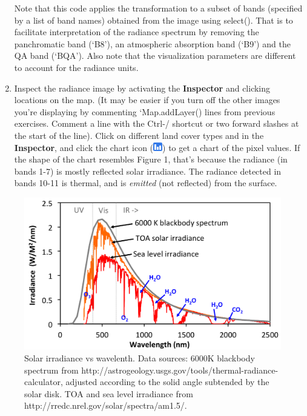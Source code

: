 \documentclass[
]{article}
\begin{document}
\begin{enumerate}
  Note that this code applies the transformation to a subset of bands (specified by a list of band names) obtained from the image using select(). That is to facilitate interpretation of the radiance spectrum by removing the panchromatic band (`B8'), an atmospheric absorption band (`B9') and the QA band (`BQA'). Also note that the visualization parameters are different to account for the radiance units.
\item
  Inspect the radiance image by activating the \textbf{Inspector} and clicking locations on the map. (It may be easier if you turn off the other images you're displaying by commenting `Map.addLayer() lines from previous exercises. Comment a line with the Ctrl-/ shortcut or two forward slashes at the start of the line). Click on different land cover types and in the \textbf{Inspector}, and click the chart icon (\includegraphics{./im/im_03_03.png}) to get a chart of the pixel values. If the shape of the chart resembles Figure 1, that's because the radiance (in bands 1-7) is mostly reflected solar irradiance. The radiance detected in bands 10-11 is thermal, and is \emph{emitted} (not reflected) from the surface.
\end{enumerate}

\begin{figure}

{\centering \includegraphics[width=0.95\linewidth]{./im/im_03_02} 

}

\caption{Solar irradiance vs wavelenth. Data sources: 6000K blackbody spectrum from http://astrogeology.usgs.gov/tools/thermal-radiance-calculator, adjusted according to the solid angle subtended by the solar disk. TOA and sea level irradiance from http://rredc.nrel.gov/solar/spectra/am1.5/.}\label{fig:irradiancewavelength}
\end{figure}
\end{document}
